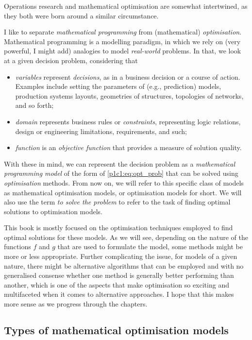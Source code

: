 Operations research and mathematical optimisation are somewhat intertwined, as they both were born around a similar circumstance. %

I like to separate \emph{mathematical programming} from (mathematical) \emph{optimisation}. Mathematical programming is a modelling paradigm, in which we rely on (very powerful, I might add) analogies to model \emph{real-world} problems. In that, we look at a given decision problem, considering that
%
\begin{itemize}
    \item \emph{variables} represent \emph{decisions}, as in a business decision or a course of action. Examples include setting the parameters of (e.g., prediction) models, production systems layouts, geometries of structures, topologies of networks, and so forth; 
    \item \emph{domain} represents business rules or \emph{constraints}, representing logic relations, design or engineering limitations, requirements, and such; 
    \item \emph{function} is an \emph{objective function} that provides a measure of solution quality.  
\end{itemize}
%    
With these in mind, we can represent the decision problem as a \emph{mathematical programming model} of the form of \eqref{p1c1:eq:opt_prob} that can be solved using \emph{optimisation} methods. From now on, we will refer to this specific class of models as mathematical optimisation models, or optimisation models for short. We will also use the term \emph{to solve the problem} to refer to the task of finding optimal solutions to optimisation models.

This book is mostly focused on the optimisation techniques employed to find optimal solutions for these models. As we will see, depending on the nature of the functions $f$ and $g$ that are used to formulate the model, some methods might be more or less appropriate. Further complicating the issue, for models of a given nature, there might be alternative algorithms that can be employed and with no generalised consense whether one method is generally better performing than another, which is one of the aspects that make optimisation so exciting and multifaceted when it comes to alternative approaches. I hope that this makes more sense as we progress through the chapters. 


\subsection{Types of mathematical optimisation models}


